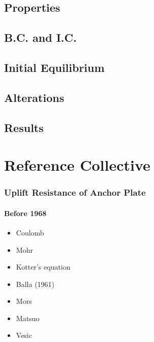 \documentclass[a4paper, nobind]{templates/ociamthesis}
\providecommand{\tightlist}{%
  \setlength{\itemsep}{0pt}\setlength{\parskip}{0pt}}
\begin{document}
\hypertarget{properties-3}{%
\section{Properties}\label{properties-3}}

\hypertarget{b.c.-and-i.c.-1}{%
\section{B.C. and I.C.}\label{b.c.-and-i.c.-1}}

\hypertarget{initial-equilibrium-3}{%
\section{Initial Equilibrium}\label{initial-equilibrium-3}}

\hypertarget{alterations-3}{%
\section{Alterations}\label{alterations-3}}

\hypertarget{results-2}{%
\section{Results}\label{results-2}}

\hypertarget{reference-collective}{%
\chapter{Reference Collective}\label{reference-collective}}

\hypertarget{uplift-resistance-of-anchor-plate}{%
\subsection{Uplift Resistance of Anchor Plate}\label{uplift-resistance-of-anchor-plate}}

\hypertarget{before-1968}{%
\subsubsection{Before 1968}\label{before-1968}}

\begin{itemize}
\tightlist
\item
  Coulomb
\item
  Mohr
\item
  Kotter's equation
\item
  Balla (1961)
\item
  Mors
\item
  Matsuo
\item
  Vesic
\end{itemize}
\end{document}
